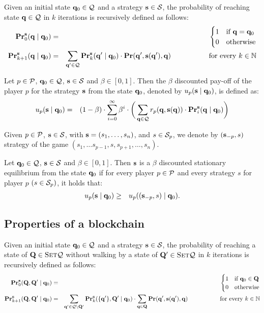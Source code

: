 Given an initial state $\mathbf{q}_0 \in \mathcal{Q}$ and a strategy $\mathbf{s} \in \mathcal{S}$, the probability of reaching state $\mathbf{q} \in \mathcal{Q}$ in $k$ iterations is recursively defined as follows:
\begin{eqnarray*}
\mathbf{Pr}_0^{\mathbf{s}}(\mathbf{q} \mid \mathbf{q}_0) & = &
\begin{cases}
1 & \text{if } \mathbf{q} = \mathbf{q}_0\\
0 & \text{otherwise}
\end{cases}\\
\mathbf{Pr}_{k+1}^{\mathbf{s}}(\mathbf{q} \mid \mathbf{q}_0) & = & \sum_{\mathbf{q}' \in \mathcal{Q}} \mathbf{Pr}_k^{\mathbf{s}}(\mathbf{q}'\mid \mathbf{q}_0) \cdot \mathbf{Pr}(\mathbf{q}', \mathbf{s}(\mathbf{q}'), \mathbf{q}) \quad \quad \quad  \quad \quad \text{ for every } k \in \mathbb{N}
\end{eqnarray*}


\begin{mydef}
Let $p \in \mathcal{P}$, $\mathbf{q}_0 \in \mathcal{Q}$, $\mathbf{s} \in \mathcal{S}$ and $\beta \in [0,1]$. Then the $\beta$ discounted pay-off of the player $p$ for the strategy $\mathbf{s}$ from the state $\mathbf{q}_0$, denoted by $u_p(\mathbf{s} \mid \mathbf{q}_0)$, is defined as:
\begin{eqnarray*}
u_p(\mathbf{s} \mid \mathbf{q}_0) & = & (1 - \beta) \cdot \sum_{i=0}^{\infty}\beta^{i} \cdot  \bigg(\sum_{\mathbf{q} \in \mathcal{Q}} r_p(\mathbf{q},\mathbf{s}(\mathbf{q})) \cdot 
\mathbf{Pr}_i^{\mathbf{s}}(\mathbf{q} \mid \mathbf{q}_0)\bigg)
\end{eqnarray*}
\end{mydef}
Given $p \in \mathcal{P}$, $\mathbf{s} \in \mathcal{S}$, with $\mathbf{s} = (s_1, \ldots, s_n)$, and $s \in \mathcal{S}_p$, we denote by $(\mathbf{s}_{-p}, s)$ strategy of the game $(s_1, \ldots s_{p-1},s,s_{p+1}, \ldots, s_{n})$.
\begin{mydef}
Let $\mathbf{q}_0 \in \mathcal{Q}$, $\mathbf{s} \in \mathcal{S}$ and $\beta \in [0,1]$. Then $\mathbf{s}$ is a $\beta$ discounted stationary equilibrium from the state $\mathbf{q}_0$ if for every player $p \in \mathcal{P}$ and every strategy $s$ for player $p$ $(s \in\mathcal{S}_p)$, it holds that:
\begin{eqnarray*}
u_p(\mathbf{s} \mid \mathbf{q}_0)  & \geq  & u_p ((\mathbf{s}_{-p},s) \mid \mathbf{q}_0).
\end{eqnarray*}
\end{mydef}

\subsection{Properties of a blockchain}

Given an initial state $\mathbf{q}_0 \in \mathcal{Q}$ and a strategy $\mathbf{s} \in \mathcal{S}$, the probability of reaching a state of $\mathbf{Q} \in \text{\sc Set}{\mathcal{Q}}$  without walking by a state of $\mathbf{Q}' \in \text{\sc Set}{\mathcal{Q}}$ in $k$ iterations is recursively defined as follows:
\begin{eqnarray*}
	\mathbf{Pr}_0^{\mathbf{s}}(\mathbf{Q},\mathbf{Q}' \mid \mathbf{q}_0) & = &
	\begin{cases}
		1 & \text{if } \mathbf{q}_0 \in \mathbf{Q}\\
		0 & \text{otherwise}
	\end{cases}\\
	\mathbf{Pr}_{k+1}^{\mathbf{s}}(\mathbf{Q},\mathbf{Q}' \mid \mathbf{q}_0) & = & \sum_{\mathbf{q}' \in \mathcal{Q} \setminus \mathbf{Q}'} \mathbf{Pr}_k^{\mathbf{s}}(\{\mathbf{q}'\},\mathbf{Q}'\mid \mathbf{q}_0) \cdot \sum_{\mathbf{q} \in \mathbf{Q}} \mathbf{Pr}(\mathbf{q}', \mathbf{s}(\mathbf{q}'), \mathbf{q}) \quad \quad \quad  \quad \quad \text{ for every } k \in \mathbb{N}
\end{eqnarray*}

